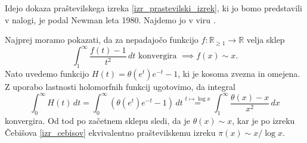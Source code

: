 Idejo dokaza praštevilskega izreka \ref{izr_prastevilski_izrek}, ki jo bomo predstavili v nalogi, je podal Newman leta 1980. Najdemo jo v viru \cite[str.~9]{mit_lecture_notes_2021}. 
\begin{skica}
Najprej moramo pokazati, da za nepadajočo funkcijo $f : \mathbb{R}_{\ge  1} \to \mathbb{R}$
velja sklep \begin{equation*}
\int_{1}^{\infty} \frac{f(t) - 1}{t^2} \, dt \text{ konvergira } \implies f(x) \sim x. 
\end{equation*}  
  Nato uvedemo funkcijo $H(t) = \theta(e^{t} )e^{-t} - 1$, ki je kosoma zvezna in omejena. Z uporabo lastnosti holomorfnih funkcij ugotovimo, da integral \begin{equation*}
  \int_{0}^{\infty} H(t)   \, dt = \int_{0}^{\infty} (\theta(e^{t} )e^{-t} - 1)  \, dt  \stackrel{t \mapsto \log x}{=} \int_{1}^{\infty}  \frac{\theta(x) -x }{x^2} \, dx 
  \end{equation*}  
   konvergira. Od tod po začetnem sklepu sledi, da je $\theta(x) \sim x$, kar je po izreku Čebišova \ref{izr_cebisov} ekvivalentno praštevilskemu izreku $\pi(x) \sim x / \log x$.  
\end{skica}



